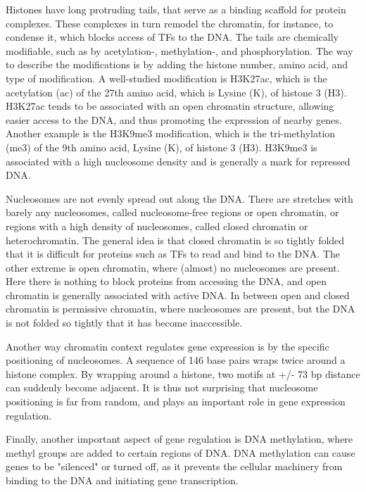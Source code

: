 Histones have long protruding tails, that serve as a binding scaffold for protein complexes. These complexes in turn remodel the chromatin, for instance, to condense it, which blocks access of TFs to the DNA. The tails are chemically modifiable, such as by acetylation-, methylation-, and phosphorylation. The way to describe the modifications is by adding the histone number, amino acid, and type of modification. A well-studied modification is H3K27ac, which is the acetylation (ac) of the 27th amino acid, which is Lysine (K), of histone 3 (H3). H3K27ac tends to be associated with an open chromatin structure, allowing easier access to the DNA, and thus promoting the expression of nearby genes\cite{Creyghton2010}. Another example is the H3K9me3 modification, which is the tri-methylation (me3) of the 9th amino acid, Lysine (K), of histone 3 (H3). H3K9me3 is associated with a high nucleosome density and is generally a mark for repressed DNA\cite{Barski2007}.

Nucleosomes are not evenly spread out along the DNA. There are stretches with barely any nucleosomes, called nucleosome-free regions or open chromatin, or regions with a high density of nucleosomes, called closed chromatin or heterochromatin. The general idea is that closed chromatin is so tightly folded that it is difficult for proteins such as TFs to read and bind to the DNA. The other extreme is open chromatin, where (almost) no nucleosomes are present. Here there is nothing to block proteins from accessing the DNA, and open chromatin is generally associated with active DNA\cite{Klemm2019}. In between open and closed chromatin is permissive chromatin, where nucleosomes are present, but the DNA is not folded so tightly that it has become inaccessible. 

Another way chromatin context regulates gene expression is by the specific positioning of nucleosomes. A sequence of 146 base pairs wraps twice around a histone complex. By wrapping around a histone, two motifs at +/- 73 bp distance can suddenly become adjacent. It is thus not surprising that nucleosome positioning is far from random, and plays an important role in gene expression regulation\cite{Jiang2009}.

Finally, another important aspect of gene regulation is DNA methylation, where methyl groups are added to certain regions of DNA. DNA methylation can cause genes to be "silenced" or turned off, as it prevents the cellular machinery from binding to the DNA and initiating gene transcription.

